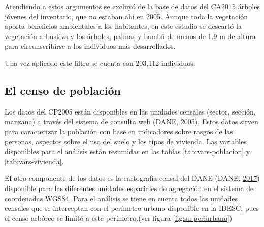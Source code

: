 \documentclass[12pt,a4paper,oneside, openany]{book}
\theoremstyle{definition}
\theoremstyle{definition}
\theoremstyle{definition}
\theoremstyle{remark}
\begin{document}
Atendiendo a estos argumentos se excluyó de la base de datos del CA2015
árboles jóvenes del inventario, que no estaban ahí en 2005. Aunque toda
la vegetación aporta beneficios ambientales a los habitantes, en este
estudio se descartó la vegetación arbustiva y los árboles, palmas y
bambú de menos de 1.9 m de altura para circunscribirse a los individuos
más desarrollados.

Una vez aplicado este filtro se cuenta con 203,112 individuos.

\subsection{El censo de población}\label{el-censo-de-poblaciuxf3n}

Los datos del CP2005 están disponibles en las unidades censales (sector,
sección, manzana) a través del sistema de consulta web (DANE,
\protect\hyperlink{ref-censo_sistema_dane}{2005}). Estos datos sirven
para caracterizar la población con base en indicadores sobre rasgos de
las personas, aspectos sobre el uso del suelo y los tipos de vivienda.
Las variables disponibles para el análisis están resumidas en las tablas
\ref{tab:vars-poblacion} y \ref{tab:vars-vivienda}.

El otro componente de los datos es la cartografía censal del DANE (DANE,
\protect\hyperlink{ref-geoportal_DANE}{2017}) disponible para las
diferentes unidades espaciales de agregación en el sistema de
coordenadas WGS84. Para el análisis se tiene en cuenta todos las
unidades censales que se interceptan con el perímetro urbano disponible
en la IDESC, pues el censo arbóreo se limitó a este perímetro.(ver
figura \ref{fig:su-periurbano})
\end{document}
